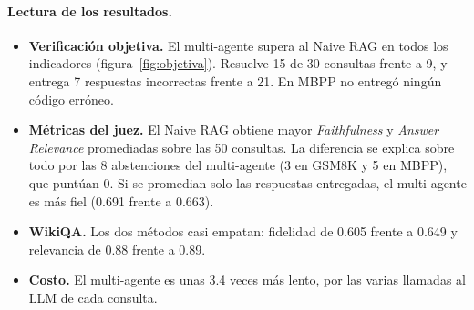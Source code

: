 \paragraph{Lectura de los resultados.}
\begin{itemize}
  \item \textbf{Verificación objetiva.} El multi-agente supera al Naive RAG en todos los indicadores (figura~\ref{fig:objetiva}).
  Resuelve 15 de 30 consultas frente a 9, y entrega 7 respuestas incorrectas frente a 21.
  En MBPP no entregó ningún código erróneo.
  \item \textbf{Métricas del juez.} El Naive RAG obtiene mayor \emph{Faithfulness} y \emph{Answer Relevance} promediadas sobre las 50 consultas.
  La diferencia se explica sobre todo por las 8 abstenciones del multi-agente (3 en GSM8K y 5 en MBPP), que puntúan 0.
  Si se promedian solo las respuestas entregadas, el multi-agente es más fiel (0.691 frente a 0.663).
  \item \textbf{WikiQA.} Los dos métodos casi empatan: fidelidad de 0.605 frente a 0.649 y relevancia de 0.88 frente a 0.89.
  \item \textbf{Costo.} El multi-agente es unas 3.4 veces más lento, por las varias llamadas al LLM de cada consulta.
\end{itemize}
